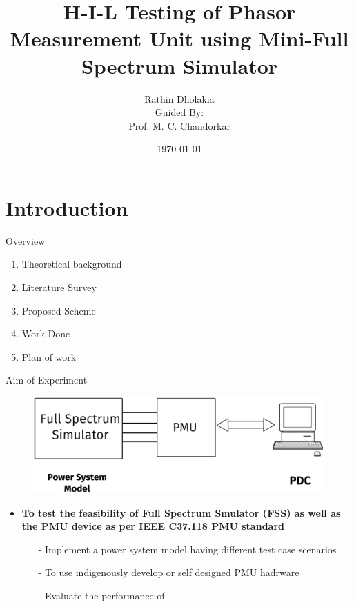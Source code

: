 \documentclass{beamer}
\title{ H-I-L Testing of Phasor Measurement Unit using Mini-Full Spectrum Simulator}
\date{\today}
\author{Rathin Dholakia \\Guided By:\\ Prof. M. C. Chandorkar}
\institute{MTP Stage - 1}
\begin{document}
  \maketitle
  \section{Introduction}


  \begin{frame}{Overview}
 	\begin{enumerate}
  	\item Theoretical background
  	\item Literature Survey
  	\item Proposed Scheme
  	\item Work Done
  	\item Plan of work
 	\end{enumerate}
   \end{frame}
 
 
 \begin{frame}{Aim of Experiment}
 \begin{figure}
 \includegraphics*[scale=0.1]{Aim.png}
 \end{figure}
 \begin{itemize}
 \item \textbf{To test the feasibility of Full Spectrum Smulator (FSS) as well as the PMU device as per IEEE C37.118 PMU standard}
 \begin{itemize}
	 \item[-] Implement a power system model having different test case scenarios
  	\item[-] To use indigenously develop or self designed PMU hadrware
	 \item[-] Evaluate the performance of
 \end{itemize}
 
 \end{itemize}
 \end{frame} 
 
\end{document}
